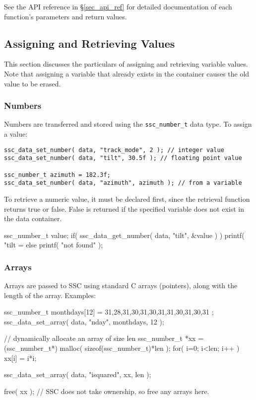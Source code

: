\documentclass{article}
\begin{document}
See the API reference in \S\ref{sec_api_ref} for detailed documentation of each function's parameters and return values.

\subsection{Assigning and Retrieving Values}

This section discusses the particulars of assigning and retrieving variable values.  Note that assigning a variable that already exists in the container causes the old value to be erased.

\subsubsection{Numbers}

Numbers are transferred and stored using the \texttt{ssc\_number\_t} data type.  To assign a value:

\begin{verbatim}
ssc_data_set_number( data, "track_mode", 2 ); // integer value
ssc_data_set_number( data, "tilt", 30.5f ); // floating point value

ssc_number_t azimuth = 182.3f;
ssc_data_set_number( data, "azimuth", azimuth ); // from a variable
\end{verbatim}

To retrieve a numeric value, it must be declared first, since the retrieval function returns true or false.  False is returned if the specified variable does not exist in the data container.

\begin{verbatimtab}[4]
ssc_number_t value;
if( ssc_data_get_number( data, "tilt", &value ) )
	printf( "tilt = %
else
	printf( "not found\n" );
\end{verbatimtab}

\subsubsection{Arrays}

Arrays are passed to SSC using standard C arrays (pointers), along with the length of the array. Examples:

\begin{verbatimtab}
ssc_number_t monthdays[12] = { 31,28,31,30,31,30,31,31,30,31,30,31 };
ssc_data_set_array( data, "nday", monthdays, 12 );

// dynamically allocate an array of size len
ssc_number_t *xx = (ssc_number_t*) malloc( sizeof(ssc_number_t)*len );
for( i=0; i<len; i++ ) xx[i] = i*i;

ssc_data_set_array( data, "isquared", xx, len );

free( xx ); // SSC does not take ownership, so free any arrays here.
\end{verbatimtab}
\end{document}
